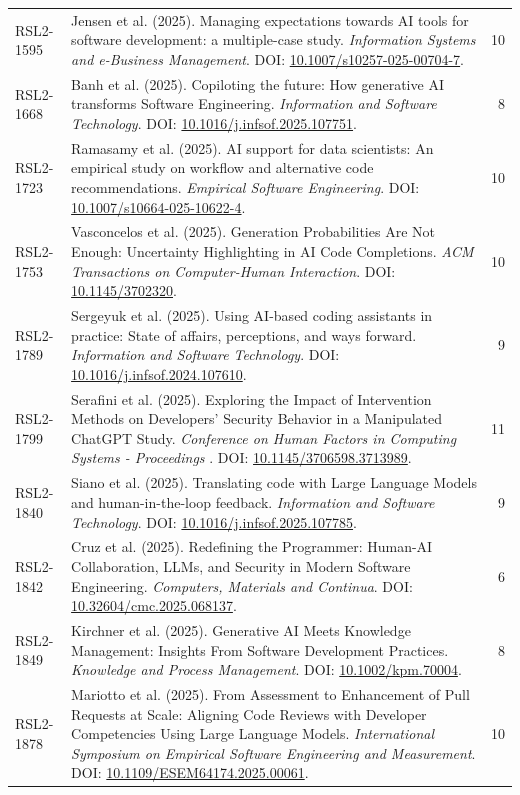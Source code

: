 \begin{small}
\begin{longtable}{lp{11.2cm}r}
RSL2-1595 & Jensen et al. (2025). Managing expectations towards AI tools for software development: a multiple-case study. \textit{Information Systems and e-Business Management}. DOI: \url{10.1007/s10257-025-00704-7}. & 10 \\
RSL2-1668 & Banh et al. (2025). Copiloting the future: How generative AI transforms Software Engineering. \textit{Information and Software Technology}. DOI: \url{10.1016/j.infsof.2025.107751}. & 8 \\
RSL2-1723 & Ramasamy et al. (2025). AI support for data scientists: An empirical study on workflow and alternative code recommendations. \textit{Empirical Software Engineering}. DOI: \url{10.1007/s10664-025-10622-4}. & 10 \\
RSL2-1753 & Vasconcelos et al. (2025). Generation Probabilities Are Not Enough: Uncertainty Highlighting in AI Code Completions. \textit{ACM Transactions on Computer-Human Interaction}. DOI: \url{10.1145/3702320}. & 10 \\
RSL2-1789 & Sergeyuk et al. (2025). Using AI-based coding assistants in practice: State of affairs, perceptions, and ways forward. \textit{Information and Software Technology}. DOI: \url{10.1016/j.infsof.2024.107610}. & 9 \\
RSL2-1799 & Serafini et al. (2025). Exploring the Impact of Intervention Methods on Developers' Security Behavior in a Manipulated ChatGPT Study. \textit{Conference on Human Factors in Computing Systems - Proceedings }. DOI: \url{10.1145/3706598.3713989}. & 11 \\
RSL2-1840 & Siano et al. (2025). Translating code with Large Language Models and human-in-the-loop feedback. \textit{Information and Software Technology}. DOI: \url{10.1016/j.infsof.2025.107785}. & 9 \\
RSL2-1842 & Cruz et al. (2025). Redefining the Programmer: Human-AI Collaboration, LLMs, and Security in Modern Software Engineering. \textit{Computers, Materials and Continua}. DOI: \url{10.32604/cmc.2025.068137}. & 6 \\
RSL2-1849 & Kirchner et al. (2025). Generative AI Meets Knowledge Management: Insights From Software Development Practices. \textit{Knowledge and Process Management}. DOI: \url{10.1002/kpm.70004}. & 8 \\
RSL2-1878 & Mariotto et al. (2025). From Assessment to Enhancement of Pull Requests at Scale: Aligning Code Reviews with Developer Competencies Using Large Language Models. \textit{International Symposium on Empirical Software Engineering and Measurement}. DOI: \url{10.1109/ESEM64174.2025.00061}. & 10 \\

\end{longtable}
\end{small}
